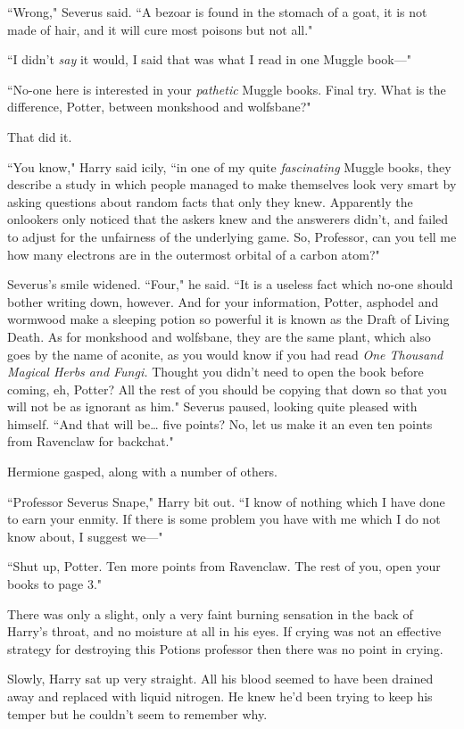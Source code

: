 ``Wrong," Severus said. ``A bezoar is found in the stomach of a goat, it is not made of hair, and it will cure most poisons but not all."

``I didn't \emph{say} it would, I said that was what I read in one Muggle book—"

``No-one here is interested in your \emph{pathetic} Muggle books. Final try. What is the difference, Potter, between monkshood and wolfsbane?"

That did it.

``You know," Harry said icily, ``in one of my quite \emph{fascinating} Muggle books, they describe a study in which people managed to make themselves look very smart by asking questions about random facts that only they knew. Apparently the onlookers only noticed that the askers knew and the answerers didn't, and failed to adjust for the unfairness of the underlying game. So, Professor, can you tell me how many electrons are in the outermost orbital of a carbon atom?"

Severus's smile widened. ``Four," he said. ``It is a useless fact which no-one should bother writing down, however. And for your information, Potter, asphodel and wormwood make a sleeping potion so powerful it is known as the Draft of Living Death. As for monkshood and wolfsbane, they are the same plant, which also goes by the name of aconite, as you would know if you had read \emph{One Thousand Magical Herbs and Fungi.} Thought you didn't need to open the book before coming, eh, Potter? All the rest of you should be copying that down so that you will not be as ignorant as him." Severus paused, looking quite pleased with himself. ``And that will be{\ldots} five points? No, let us make it an even ten points from Ravenclaw for backchat."

Hermione gasped, along with a number of others.

``Professor Severus Snape," Harry bit out. ``I know of nothing which I have done to earn your enmity. If there is some problem you have with me which I do not know about, I suggest we—"

``Shut up, Potter. Ten more points from Ravenclaw. The rest of you, open your books to page 3."

There was only a slight, only a very faint burning sensation in the back of Harry's throat, and no moisture at all in his eyes. If crying was not an effective strategy for destroying this Potions professor then there was no point in crying.

Slowly, Harry sat up very straight. All his blood seemed to have been drained away and replaced with liquid nitrogen. He knew he'd been trying to keep his temper but he couldn't seem to remember why.


